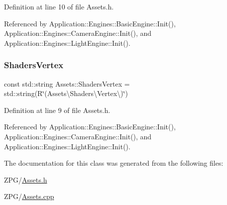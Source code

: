 Definition at line 10 of file Assets.\+h.



Referenced by Application\+::\+Engines\+::\+Basic\+Engine\+::\+Init(), Application\+::\+Engines\+::\+Camera\+Engine\+::\+Init(), and Application\+::\+Engines\+::\+Light\+Engine\+::\+Init().

\mbox{\label{classAssets_ac712d5aca276086a3734e2e9f74cfc6b}} 
\subsubsection{\texorpdfstring{Shaders\+Vertex}{ShadersVertex}}
{\footnotesize\ttfamily const std\+::string Assets\+::\+Shaders\+Vertex = std\+::string(R\char`\"{}(Assets\textbackslash{}\+Shaders\textbackslash{}\+Vertex\textbackslash{})\char`\"{})\hspace{0.3cm}{\ttfamily [static]}}



Definition at line 9 of file Assets.\+h.



Referenced by Application\+::\+Engines\+::\+Basic\+Engine\+::\+Init(), Application\+::\+Engines\+::\+Camera\+Engine\+::\+Init(), and Application\+::\+Engines\+::\+Light\+Engine\+::\+Init().



The documentation for this class was generated from the following files\+:\begin{DoxyCompactItemize}
\item 
Z\+P\+G/\mbox{\hyperlink{Assets_8h}{Assets.\+h}}\item 
Z\+P\+G/\mbox{\hyperlink{Assets_8cpp}{Assets.\+cpp}}\end{DoxyCompactItemize}

